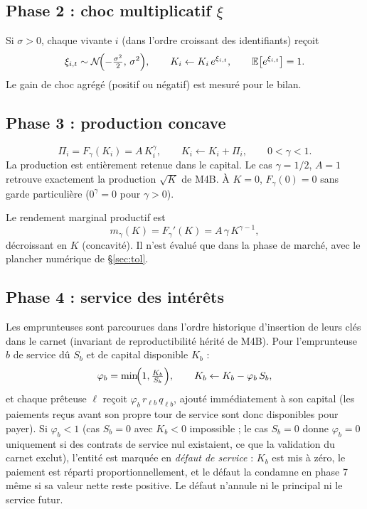\documentclass[11pt,a4paper]{article}
\newcommand{\E}{\mathbb{E}}
\begin{document}
\subsection{Phase 2 : choc multiplicatif $\xi$}

Si $\sigma>0$, chaque vivante $i$ (dans l'ordre croissant des
identifiants) reçoit
\begin{equation}
\xi_{i,t}\sim\mathcal N\!\Bigl(-\tfrac{\sigma^2}{2},\,\sigma^2\Bigr),
\qquad K_i \leftarrow K_i\,e^{\xi_{i,t}},
\qquad \E\bigl[e^{\xi_{i,t}}\bigr]=1 .
\end{equation}
Le gain de choc agrégé (positif ou négatif) est mesuré pour le bilan.

\subsection{Phase 3 : production concave}
\label{sec:prod}

\begin{equation}
\Pi_i = F_\gamma(K_i) = A\,K_i^{\gamma},
\qquad K_i \leftarrow K_i + \Pi_i ,
\qquad 0<\gamma<1 .
\end{equation}
La production est entièrement retenue dans le capital. Le cas $\gamma=1/2$,
$A=1$ retrouve exactement la production $\sqrt{K}$ de M4B. À $K=0$,
$F_\gamma(0)=0$ sans garde particulière ($0^\gamma=0$ pour $\gamma>0$).

Le rendement marginal productif est
\begin{equation}
m_\gamma(K) = F_\gamma'(K) = A\,\gamma\,K^{\gamma-1},
\label{eq:marginal}
\end{equation}
décroissant en $K$ (concavité). Il n'est évalué que dans la phase de marché,
avec le plancher numérique de §\ref{sec:tol}.

\subsection{Phase 4 : service des intérêts}

Les emprunteuses sont parcourues dans l'ordre historique d'insertion de
leurs clés dans le carnet (invariant de reproductibilité hérité de M4B).
Pour l'emprunteuse $b$ de service dû $S_b$ et de capital disponible $K_b$ :
\begin{equation}
\varphi_b=\min\!\Bigl(1,\tfrac{K_b}{S_b}\Bigr),\qquad
K_b \leftarrow K_b - \varphi_b\,S_b ,
\end{equation}
et chaque prêteuse $\ell$ reçoit $\varphi_b\,r_{\ell b}\,q_{\ell b}$,
ajouté immédiatement à son capital (les paiements reçus avant son propre
tour de service sont donc disponibles pour payer). Si $\varphi_b<1$
(cas $S_b=0$ avec $K_b<0$ impossible ; le cas $S_b=0$ donne $\varphi_b=0$
uniquement si des contrats de service nul existaient, ce que la validation
du carnet exclut), l'entité est marquée en \emph{défaut de service} :
$K_b$ est mis à zéro, le paiement est réparti proportionnellement, et le
défaut la condamne en phase 7 même si sa valeur nette reste positive. Le
défaut n'annule ni le principal ni le service futur.
\end{document}
